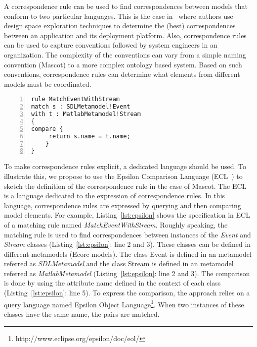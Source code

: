 A correspondence rule can be used to find correspondences between models that conform to two particular languages. This is the case in~\cite{kofmanbib} where authors use design space exploration techniques to determine the (best) correspondences between an application and its deployment platform. Also, correspondence rules can be used to capture conventions followed by system engineers in an organization. The complexity of the conventions can vary from a simple naming convention (\eg Mascot) to a more complex ontology based system. Based on such conventions, correspondence rules can determine what elements from different models must be coordinated.    

\begin{lstlisting}[language=epsilon, caption={The Mascot correspondence rule in the Epsilon Comparison Language}, label={lst:epsilon}, 	basicstyle=\scriptsize\ttfamily, backgroundcolor=\color{LGrey}, numbers=left, xleftmargin=2pt]
rule MatchEventWithStream
match s : SDLMetamodel!Event
with t : MatlabMetamodel!Stream 
{
compare {
	 return s.name = t.name;
	}
}
\end{lstlisting}

To make correspondence rules explicit, a dedicated language should be used. To illustrate this, we propose to use the Epsilon Comparison Language (ECL~\cite{epsilonbib}) to sketch the definition of the correspondence rule in the case of Mascot. The ECL is a language dedicated to the expression of correspondence rules. In this language, correspondence rules are expressed by querying and then comparing model elements. For example, Listing~\ref{lst:epsilon} shows the specification in ECL of a matching rule named \emph{MatchEventWithStream}. Roughly speaking, the matching rule is used to find correspondences between instances of the \emph{Event} and \emph{Stream} classes (Listing~\ref{lst:epsilon}: line 2 and 3). These classes can be defined in different metamodels (\ie Ecore models). The class Event is defined in an metamodel referred as \emph{SDLMetamodel} and the class Stream is defined in an metamodel referred as \emph{MatlabMetamodel} (Listing~\ref{lst:epsilon}: line 2 and 3). The comparison is done by using the attribute name defined in the context of each class (Listing~\ref{lst:epsilon}: line 5). To express the comparison, the approach relies on a query language named Epsilon Object Language\footnote{http://www.eclipse.org/epsilon/doc/eol/}. When two instances of these classes have the same name, the pairs are matched.


